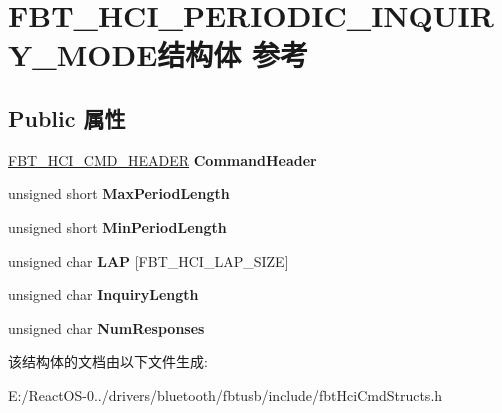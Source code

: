 \hypertarget{struct_f_b_t___h_c_i___p_e_r_i_o_d_i_c___i_n_q_u_i_r_y___m_o_d_e}{}\section{F\+B\+T\+\_\+\+H\+C\+I\+\_\+\+P\+E\+R\+I\+O\+D\+I\+C\+\_\+\+I\+N\+Q\+U\+I\+R\+Y\+\_\+\+M\+O\+D\+E结构体 参考}
\label{struct_f_b_t___h_c_i___p_e_r_i_o_d_i_c___i_n_q_u_i_r_y___m_o_d_e}
\subsection*{Public 属性}
\begin{DoxyCompactItemize}
\item 
\mbox{\label{struct_f_b_t___h_c_i___p_e_r_i_o_d_i_c___i_n_q_u_i_r_y___m_o_d_e_a736f814a44d0956fddab7a81f33c7d56}} 
\hyperlink{struct_f_b_t___h_c_i___c_m_d___h_e_a_d_e_r}{F\+B\+T\+\_\+\+H\+C\+I\+\_\+\+C\+M\+D\+\_\+\+H\+E\+A\+D\+ER} {\bfseries Command\+Header}
\item 
\mbox{\label{struct_f_b_t___h_c_i___p_e_r_i_o_d_i_c___i_n_q_u_i_r_y___m_o_d_e_a424cbfc31123f63cd318bb55a9cbdbba}} 
unsigned short {\bfseries Max\+Period\+Length}
\item 
\mbox{\label{struct_f_b_t___h_c_i___p_e_r_i_o_d_i_c___i_n_q_u_i_r_y___m_o_d_e_a42c60ef18a726d127d6871339d3b0659}} 
unsigned short {\bfseries Min\+Period\+Length}
\item 
\mbox{\label{struct_f_b_t___h_c_i___p_e_r_i_o_d_i_c___i_n_q_u_i_r_y___m_o_d_e_a5e7d435ac9b570ebf68df8612b557b38}} 
unsigned char {\bfseries L\+AP} \mbox{[}F\+B\+T\+\_\+\+H\+C\+I\+\_\+\+L\+A\+P\+\_\+\+S\+I\+ZE\mbox{]}
\item 
\mbox{\label{struct_f_b_t___h_c_i___p_e_r_i_o_d_i_c___i_n_q_u_i_r_y___m_o_d_e_aaaafb05be139670af8f26605675e4db8}} 
unsigned char {\bfseries Inquiry\+Length}
\item 
\mbox{\label{struct_f_b_t___h_c_i___p_e_r_i_o_d_i_c___i_n_q_u_i_r_y___m_o_d_e_a416a8ed94f6878a753dcdfcd0430d28b}} 
unsigned char {\bfseries Num\+Responses}
\end{DoxyCompactItemize}


该结构体的文档由以下文件生成\+:\begin{DoxyCompactItemize}
\item 
E\+:/\+React\+O\+S-\/0../drivers/bluetooth/fbtusb/include/fbt\+Hci\+Cmd\+Structs.\+h\end{DoxyCompactItemize}
